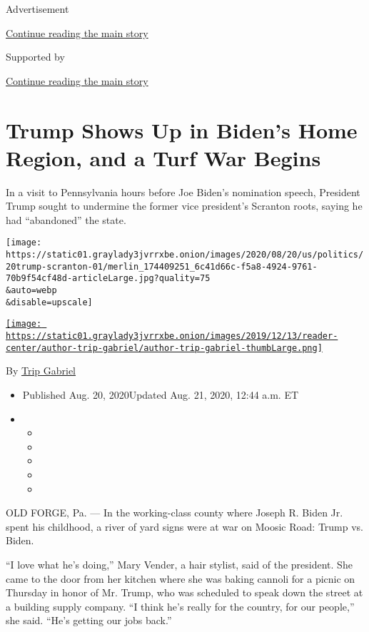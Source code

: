 Advertisement

\protect\hyperlink{after-top}{Continue reading the main story}

Supported by

\protect\hyperlink{after-sponsor}{Continue reading the main story}

\hypertarget{trump-shows-up-in-bidens-home-region-and-a-turf-war-begins}{%
\section{Trump Shows Up in Biden's Home Region, and a Turf War
Begins}\label{trump-shows-up-in-bidens-home-region-and-a-turf-war-begins}}

In a visit to Pennsylvania hours before Joe Biden's nomination speech,
President Trump sought to undermine the former vice president's Scranton
roots, saying he had ``abandoned'' the state.

\texttt{[image: https://static01.graylady3jvrrxbe.onion/images/2020/08/20/us/politics/20trump-scranton-01/merlin\_174409251\_6c41d66c-f5a8-4924-9761-70b9f54cf48d-articleLarge.jpg?quality=75\\\&auto=webp\\\&disable=upscale]}

\href{https://www.nytimes3xbfgragh.onion/by/trip-gabriel}{\texttt{[image: https://static01.graylady3jvrrxbe.onion/images/2019/12/13/reader-center/author-trip-gabriel/author-trip-gabriel-thumbLarge.png]}}

By \href{https://www.nytimes3xbfgragh.onion/by/trip-gabriel}{Trip
Gabriel}

\begin{itemize}
\item
  Published Aug. 20, 2020Updated Aug. 21, 2020, 12:44 a.m. ET
\item
  \begin{itemize}
  \item
  \item
  \item
  \item
  \item
  \end{itemize}
\end{itemize}

OLD FORGE, Pa. --- In the working-class county where Joseph R. Biden Jr.
spent his childhood, a river of yard signs were at war on Moosic Road:
Trump vs. Biden.

``I love what he's doing,'' Mary Vender, a hair stylist, said of the
president. She came to the door from her kitchen where she was baking
cannoli for a picnic on Thursday in honor of Mr. Trump, who was
scheduled to speak down the street at a building supply company. ``I
think he's really for the country, for our people,'' she said. ``He's
getting our jobs back.''

